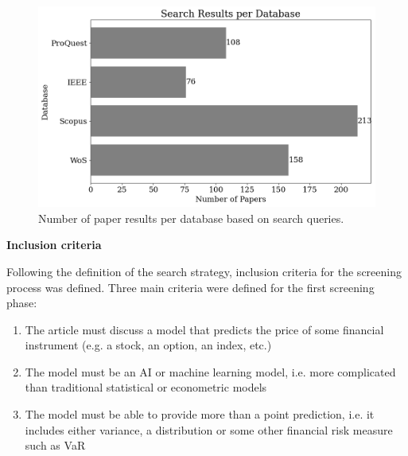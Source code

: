 \begin{figure}[H]
    \centering
    \includegraphics[width=1\linewidth]{Images/search_sample_by_database.png}
    \caption{Number of paper results per database based on search queries.}
    \label{fig:search_sample_by_database}
\end{figure}



\textbf{Inclusion criteria}\nopagebreak

Following the definition of the search strategy, inclusion criteria for the screening process was defined. Three main criteria were defined for the first screening phase:

\begin{enumerate}
    \item The article must discuss a model that predicts the price of some financial instrument (e.g. a stock, an option, an index, etc.)
    \item The model must be an AI or machine learning model, i.e. more complicated than traditional statistical or econometric models
    \item The model must be able to provide more than a point prediction, i.e. it includes either variance, a distribution or some other financial risk measure such as VaR
\end{enumerate}

